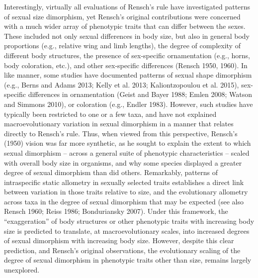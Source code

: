 \documentclass[]{article}
\begin{document}
Interestingly, virtually all evaluations of Rensch's rule have
investigated patterns of sexual size dimorphism, yet Rensch's original
contributions were concerned with a much wider array of phenotypic
traits that can differ between the sexes. These included not only sexual
differences in body size, but also in general body proportions (e.g.,
relative wing and limb lengths), the degree of complexity of different
body structures, the presence of sex-specific ornamentation (e.g.,
horns, body coloration, etc.), and other sex-specific differences
(Rensch 1950, 1960). In like manner, some studies have documented
patterns of sexual shape dimorphism (e.g., Berns and Adams 2013; Kelly
et al. 2013; Kaliontzopoulou et al. 2015), sex-specific differences in
ornamentation (Geist and Bayer 1988; Emlen 2008; Watson and Simmons
2010), or coloration (e.g., Endler 1983). However, such studies have
typically been restricted to one or a few taxa, and have not explained
macroevolutionary variation in sexual dimorphism in a manner that
relates directly to Rensch's rule. Thus, when viewed from this
perspective, Rensch's (1950) vision was far more synthetic, as he sought
to explain the extent to which sexual dimorphism -- across a general
suite of phenotypic characteristics -- scaled with overall body size in
organisms, and why some species displayed a greater degree of sexual
dimorphism than did others. Remarkably, patterns of intraspecific static
allometry in sexually selected traits establishes a direct link between
variation in those traits relative to size, and the evolutionary
allometry across taxa in the degree of sexual dimorphism that may be
expected (see also Rensch 1960; Reiss 1986; Bonduriansky 2007). Under
this framework, the ``exaggeration'' of body structures or other
phenotypic traits with increasing body size is predicted to translate,
at macroevolutionary scales, into increased degrees of sexual dimorphism
with increasing body size. However, despite this clear prediction, and
Rensch's original observations, the evolutionary scaling of the degree
of sexual dimorphism in phenotypic traits other than size, remains
largely unexplored. \hfill\break
\end{document}
